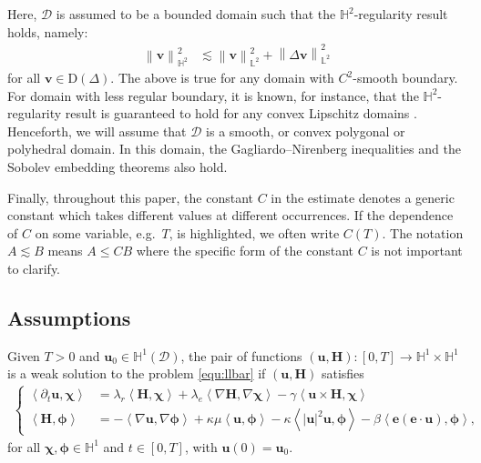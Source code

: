 \documentclass[11pt, reqno]{amsart}
\theoremstyle{definition}
\theoremstyle{remark}
\numberwithin{equation}{section}
\newcommand{\bff}{\boldsymbol}
\newcommand{\bb}{\mathbb}
\newcommand{\norm}[2]{\left\|{#1}\right\|_{#2}}
\newcommand{\inpro}[2]{\left\langle#1,#2\right\rangle}
\begin{document}
Here, $\mathscr{D}$ is assumed to be a bounded domain such that the $\bb{H}^2$-regularity result holds, namely:
\begin{align*}
	\norm{\bff{v}}{\bb{H}^2}^2
	&\lesssim 
	\norm{\bff{v}}{\bb{L}^2}^2 + \norm{\Delta \bff{v}}{\bb{L}^2}^2
\end{align*}
for all $\bff{v}\in \mathrm{D}(\Delta)$. The above is true for any domain with $C^2$-smooth boundary. For domain with less regular boundary, it is known, for instance, that the $\bb{H}^2$-regularity result is guaranteed to hold for any convex Lipschitz domains \cite{Gri11}. Henceforth, we will assume that $\mathscr{D}$ is a smooth, or convex polygonal or polyhedral domain. In this domain, the Gagliardo--Nirenberg inequalities and the Sobolev embedding theorems also hold.

Finally, throughout this paper, the constant $C$ in the estimate denotes a
generic constant which takes different values at different occurrences. If
the dependence of $C$ on some variable, e.g.~$T$, is highlighted, we often write
$C(T)$. The notation $A \lesssim B$ means $A \le C B$ where the specific form of
the constant $C$ is not important to clarify.


\subsection{Assumptions}\label{sec:exact sol}
Given $T>0$ and $\bff{u}_0\in\bb{H}^1(\mathscr{D})$, the pair of functions $(\bff{u}, \bff{H}):[0,T]\to \bb{H}^1 \times \bb{H}^1$ is a weak solution to the problem
\eqref{equ:llbar} if $(\bff{u}, \bff{H}) $ satisfies
\begin{align}\label{equ:weakform}
	\left\{
	\begin{alignedat}{1}
		\inpro{ \partial_t \bff{u}}{\bff{\chi}}
		&=
		\lambda_r \inpro{\bff{H}}{\bff{\chi}}
		+
		\lambda_e \inpro{\nabla \bff{H}}{\nabla \bff{\chi}}
		-
		\gamma \inpro{\bff{u} \times \bff{H}}{\bff{\chi}}
		\\
		\inpro{\bff{H}}{\bff{\phi}} 
		&=
		-
		\inpro{\nabla \bff{u}}{\nabla \bff{\phi}}
		+
		\kappa \mu \inpro{\bff{u}}{\bff{\phi}}
		-
		\kappa \inpro{|\bff{u}|^2 \bff{u}}{\bff{\phi}}
		-
		\beta \inpro{\bff{e}(\bff{e}\cdot \bff{u})}{\bff{\phi}},
	\end{alignedat}
	\right.
\end{align}
for all $\bff{\chi}, \bff{\phi}\in \bb{H}^1$ and $t\in [0,T]$, with $\bff{u}(0)=\bff{u}_0$.
\end{document}
